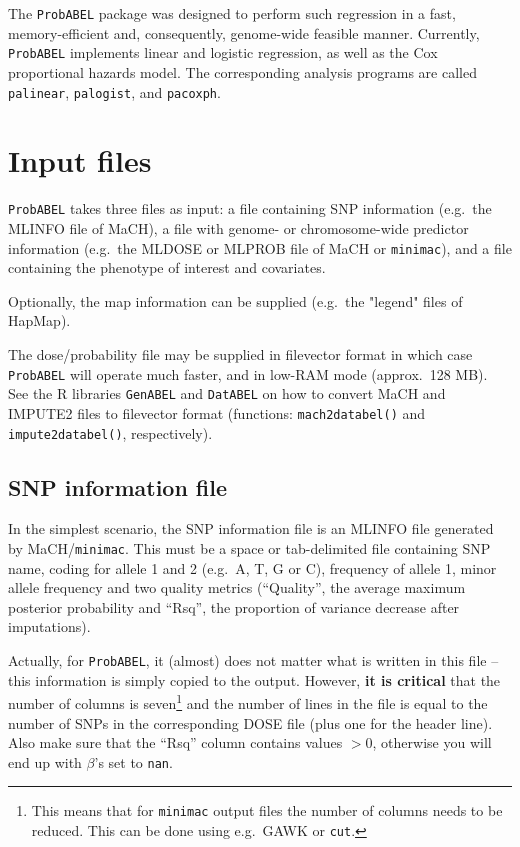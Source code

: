 \documentclass[12pt,a4paper]{article}
\newcommand{\PA}{\texttt{ProbABEL}}
\newcommand{\GA}{\texttt{GenABEL}}
\newcommand{\DA}{\texttt{DatABEL}}
\begin{document}
The \PA{} package was designed to perform such regression
in a fast, memory-efficient and, consequently, genome-wide feasible manner.
Currently, \PA{} implements linear and logistic regression,
as well as the Cox proportional hazards model. The corresponding analysis
programs are called \texttt{palinear},  \texttt{palogist},
and \texttt{pacoxph}.


\section{Input files}
\PA{} takes three files as input: a file containing SNP
information (e.g.~the MLINFO file of MaCH), a file with genome- or
chromosome-wide predictor information (e.g.~the MLDOSE or MLPROB file
of MaCH or \texttt{minimac}),
and a file containing the phenotype of interest and covariates.

Optionally, the map information can be supplied (e.g.~the "legend"
files of HapMap).

The dose/probability file may be supplied in filevector format
in which case \PA{} will operate much faster, and
in low-RAM mode (approx.~128 MB). See the R libraries \GA{} and
\DA{} on how to convert MaCH and IMPUTE2 files to
filevector format (functions: \texttt{mach2databel()} and
\texttt{impute2databel()}, respectively).

\subsection{SNP information file}
\label{ssec:infoin}
In the simplest scenario, the SNP information file is an MLINFO
file generated by MaCH/\texttt{minimac}. This must be a space or tab-delimited file
containing SNP name, coding for allele 1 and 2 (e.g.~A, T, G or C),
frequency of allele 1, minor allele frequency and two quality
metrics (``Quality'', the average maximum posterior probability and
``Rsq'', the proportion of variance decrease after imputations).

Actually, for \PA{}, it (almost) does not matter what is written in
this file -- this information is simply copied to the output. However,
\textbf{it is critical} that the number of columns is
seven\footnote{This means that for \texttt{minimac} output files the number of
  columns needs to be reduced. This can be done using e.g.~GAWK or
  \texttt{cut}.} and the number of lines in the file is equal to the
number of SNPs in the corresponding DOSE file (plus one for the header
line). Also make sure that the ``Rsq'' column contains values $>0$,
otherwise you will end up with $\beta$'s set to \texttt{nan}.
\end{document}
